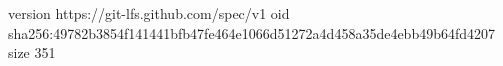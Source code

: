version https://git-lfs.github.com/spec/v1
oid sha256:49782b3854f141441bfb47fe464e1066d51272a4d458a35de4ebb49b64fd4207
size 351
